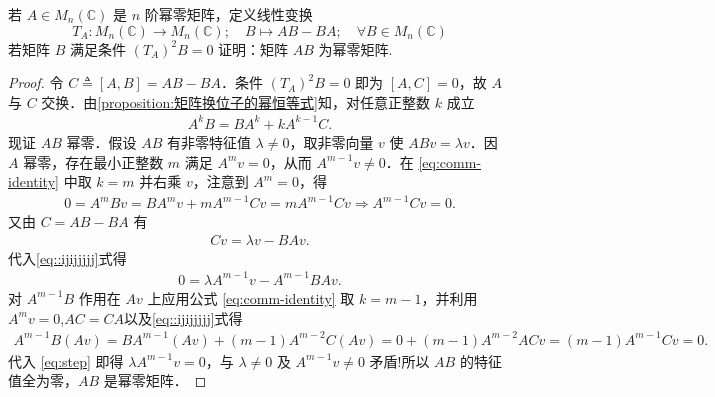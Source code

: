 \documentclass[../../main.tex]{subfiles}%
\begin{document}
\begin{example}
若 \(A \in M_n(\mathbb{C})\) 是 \(n\) 阶幂零矩阵，定义线性变换
\[
T_A : M_n(\mathbb{C}) \to M_n(\mathbb{C}); \quad B \mapsto AB - BA; \quad \forall B \in M_n(\mathbb{C})
\]
若矩阵 \(B\) 满足条件 \((T_A)^2 B = 0\) 证明：矩阵 \(AB\) 为幂零矩阵.
\end{example}
\begin{proof}
令 $C \triangleq [A,B] = AB - BA$．条件 $(T_A)^2 B = 0$ 即为 $[A,C] = 0$，故 $A$ 与 $C$ 交换．由\cref{proposition:矩阵换位子的幂恒等式}知，对任意正整数 $k$ 成立
\begin{align}
A^k B = B A^k + k A^{k-1} C. \label{eq:comm-identity}
\end{align}
现证 $AB$ 幂零．假设 $AB$ 有非零特征值 $\lambda \neq 0$，取非零向量 $v$ 使 $AB v = \lambda v$．因 $A$ 幂零，存在最小正整数 $m$ 满足 $A^m v = 0$，从而 $A^{m-1} v \neq 0$．在 \eqref{eq:comm-identity} 中取 $k = m$ 并右乘 $v$，注意到 $A^m = 0$，得
\begin{align}\label{eq::ijijjjjj}
0 = A^m B v = B A^m v + m A^{m-1} C v = m A^{m-1} C v\Longrightarrow A^{m-1} C v = 0.
\end{align}
又由 $C = AB - BA$ 有
\begin{align*}
C v = \lambda v - B A v.
\end{align*}
代入\eqref{eq::ijijjjjj}式得
\begin{align}
0 = \lambda A^{m-1} v - A^{m-1} B A v. \label{eq:step}
\end{align}
对 $A^{m-1} B$ 作用在 $A v$ 上应用公式 \eqref{eq:comm-identity} 取 $k = m-1$，并利用 $A^m v = 0$,$A C = C A$以及\eqref{eq::ijijjjjj}式得
\begin{align*}
A^{m-1} B (A v) = B A^{m-1} (A v) + (m-1) A^{m-2} C (A v) = 0 + (m-1) A^{m-2} A C v = (m-1) A^{m-1} C v = 0.
\end{align*}
代入 \eqref{eq:step} 即得 $\lambda A^{m-1} v = 0$，与 $\lambda \neq 0$ 及 $A^{m-1} v \neq 0$ 矛盾!所以 $AB$ 的特征值全为零，$AB$ 是幂零矩阵．\end{proof}
\end{document}
